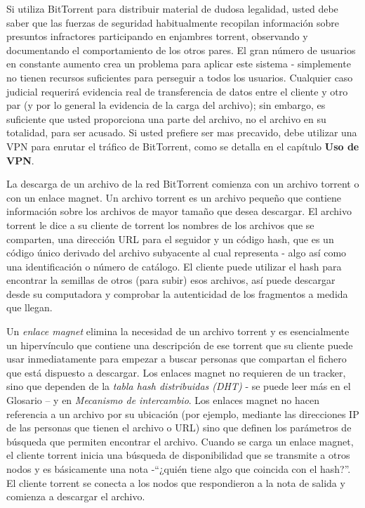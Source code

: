 \documentclass[10pt,a5paper,twoside,,]{book}
\begin{document}
Si utiliza BitTorrent para distribuir material de dudosa legalidad,
usted debe saber que las fuerzas de seguridad habitualmente recopilan
información sobre presuntos infractores participando en enjambres
torrent, observando y documentando el comportamiento de los otros pares.
El gran número de usuarios en constante aumento crea un problema para
aplicar este sistema - simplemente no tienen recursos suficientes para
perseguir a todos los usuarios. Cualquier caso judicial requerirá
evidencia real de transferencia de datos entre el cliente y otro par (y
por lo general la evidencia de la carga del archivo); sin embargo, es
suficiente que usted proporciona una parte del archivo, no el archivo en
su totalidad, para ser acusado. Si usted prefiere ser mas precavido,
debe utilizar una VPN para enrutar el tráfico de BitTorrent, como se
detalla en el capítulo \textbf{Uso de VPN}.

La descarga de un archivo de la red BitTorrent comienza con un archivo
torrent o con un enlace magnet. Un archivo torrent es un archivo pequeño
que contiene información sobre los archivos de mayor tamaño que desea
descargar. El archivo torrent le dice a su cliente de torrent los
nombres de los archivos que se comparten, una dirección URL para el
seguidor y un código hash, que es un código único derivado del archivo
subyacente al cual representa - algo así como una identificación o
número de catálogo. El cliente puede utilizar el hash para encontrar la
semillas de otros (para subir) esos archivos, así puede descargar desde
su computadora y comprobar la autenticidad de los fragmentos a medida
que llegan.

Un \emph{enlace magnet} elimina la necesidad de un archivo torrent y es
esencialmente un hipervínculo que contiene una descripción de ese
torrent que su cliente puede usar inmediatamente para empezar a buscar
personas que compartan el fichero que está dispuesto a descargar. Los
enlaces magnet no requieren de un tracker, sino que dependen de la
\emph{tabla hash distribuidas (DHT)} - se puede leer más en el Glosario
-- y en \emph{Mecanismo de intercambio}. Los enlaces magnet no hacen
referencia a un archivo por su ubicación (por ejemplo, mediante las
direcciones IP de las personas que tienen el archivo o URL) sino que
definen los parámetros de búsqueda que permiten encontrar el archivo.
Cuando se carga un enlace magnet, el cliente torrent inicia una búsqueda
de disponibilidad que se transmite a otros nodos y es básicamente una
nota -``¿quién tiene algo que coincida con el hash?''. El cliente
torrent se conecta a los nodos que respondieron a la nota de salida y
comienza a descargar el archivo.
\end{document}
